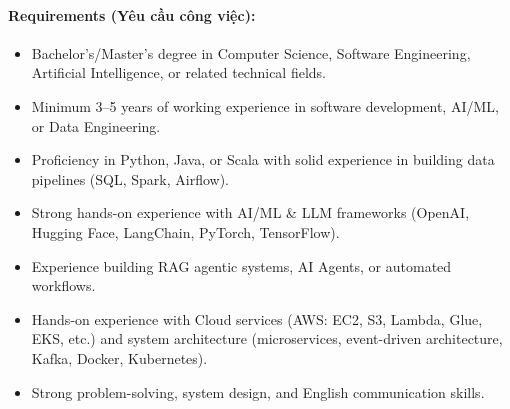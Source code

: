 \paragraph{Requirements (Yêu cầu công việc):}
\begin{itemize}
    \item Bachelor's/Master's degree in Computer Science, Software Engineering, Artificial Intelligence, or related technical fields.
    \item Minimum 3--5 years of working experience in software development, AI/ML, or Data Engineering.
    \item Proficiency in Python, Java, or Scala with solid experience in building data pipelines (SQL, Spark, Airflow).
    \item Strong hands-on experience with AI/ML \& LLM frameworks (OpenAI, Hugging Face, LangChain, PyTorch, TensorFlow).
    \item Experience building RAG agentic systems, AI Agents, or automated workflows.
    \item Hands-on experience with Cloud services (AWS: EC2, S3, Lambda, Glue, EKS, etc.) and system architecture (microservices, event-driven architecture, Kafka, Docker, Kubernetes).
    \item Strong problem-solving, system design, and English communication skills.
\end{itemize}
